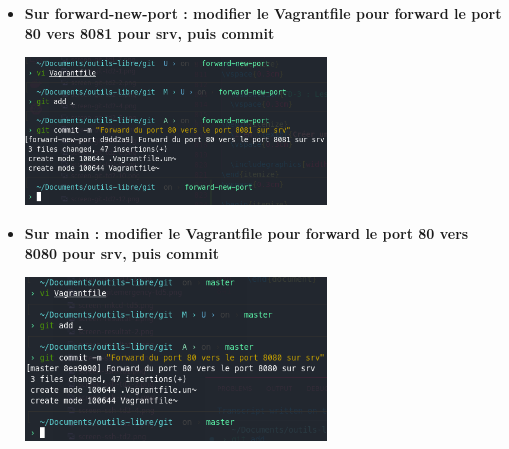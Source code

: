 \documentclass[12pt]{article}
\begin{document}
\begin{itemize}
  \item \textbf{Sur forward-new-port : modifier le Vagrantfile pour forward le port 80 vers 8081 pour srv, puis commit}
  \vspace{0.3cm}

  \includegraphics[width=8cm]{images/screen-git-td3-2.png}
\end{itemize}
\vspace{0.3cm}

\begin{itemize}
  \item \textbf{Sur main : modifier le Vagrantfile pour forward le port 80 vers 8080 pour srv, puis commit}
  \vspace{0.3cm}

  \includegraphics[width=8cm]{images/screen-git-td3-3.png}
\end{itemize}
\vspace{0.3cm}
\end{document}
